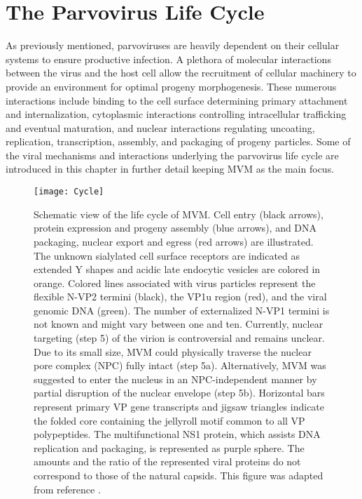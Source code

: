 
\chapter{The Parvovirus Life Cycle} %

\label{Chapter7} %


As previously mentioned, parvoviruses are heavily dependent on their cellular systems to ensure productive infection. A plethora of molecular interactions between the virus and the host cell allow the recruitment of cellular machinery to provide an environment for optimal progeny morphogenesis. These numerous interactions include binding to the cell surface determining primary attachment and internalization, cytoplasmic interactions controlling intracellular trafficking and eventual maturation, and nuclear interactions regulating uncoating, replication, transcription, assembly, and packaging of progeny particles. Some of the viral mechanisms and interactions underlying the parvovirus life cycle are introduced in this chapter in further detail keeping MVM as the main focus.     


\begin{figure}[H]
\centering
  \texttt{[image: Cycle]}
  \caption[Life cycle of MVM]
   {Schematic view of the life cycle of MVM. Cell entry (black arrows), protein expression and progeny assembly (blue arrows), and DNA packaging, nuclear export and egress (red arrows) are illustrated. The unknown sialylated cell surface receptors are indicated as extended Y shapes and acidic late endocytic vesicles are colored in orange. Colored lines associated with virus particles represent the flexible N-VP2 termini (black), the VP1u region (red), and the viral genomic DNA (green). The number of externalized N-VP1 termini is not known and might vary between one and ten. Currently, nuclear targeting (step 5) of the virion is controversial and remains unclear. Due to its small size, MVM could physically traverse the nuclear pore complex (NPC) fully intact (step 5a). Alternatively, MVM was suggested to enter the nucleus in an NPC-independent manner by partial disruption of the nuclear envelope (step 5b). Horizontal bars represent primary VP gene transcripts and jigsaw triangles indicate the folded core containing the jellyroll motif common to all VP polypeptides. The multifunctional NS1 protein, which assists DNA replication and packaging, is represented as purple sphere. The amounts and the ratio of the represented viral proteins do not correspond to those of the natural capsids. This figure was adapted from reference \cite{small}.  
} 
\label{Cycle}
\end{figure}


